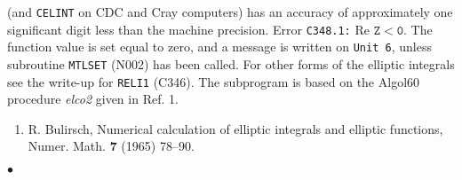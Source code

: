 (and {\tt CELINT} on CDC and Cray computers) has an accuracy of
approximately one significant digit less than the machine precision.
\Errorh
Error {\tt C348.1:} Re $\mathtt{Z < 0}$.
The function value is set equal to zero, and a message is written on
{\tt Unit 6}, unless subroutine {\tt MTLSET} (N002) has been called.
\newpage
\Notes
For other forms of the elliptic integrals see the write-up
for {\tt RELI1} (C346).
\Source
The subprogram is based on the Algol60 procedure {\it elco2}
given in Ref. 1.
\Refer
\begin{enumerate}
\item R. Bulirsch, Numerical calculation of elliptic integrals and
elliptic functions, Numer. Math. {\bf 7} (1965) 78--90.
\end{enumerate}
$\bullet$

